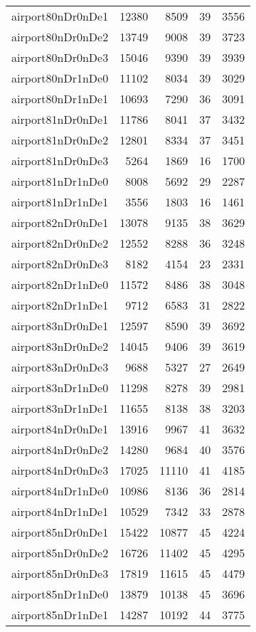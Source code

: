 \begin{longtable}{lrrrr}
airport80nDr0nDe1 & 12380 & 8509 & 39 & 3556 \\
airport80nDr0nDe2 & 13749 & 9008 & 39 & 3723 \\
airport80nDr0nDe3 & 15046 & 9390 & 39 & 3939 \\
airport80nDr1nDe0 & 11102 & 8034 & 39 & 3029 \\
airport80nDr1nDe1 & 10693 & 7290 & 36 & 3091 \\
airport81nDr0nDe1 & 11786 & 8041 & 37 & 3432 \\
airport81nDr0nDe2 & 12801 & 8334 & 37 & 3451 \\
airport81nDr0nDe3 & 5264 & 1869 & 16 & 1700 \\
airport81nDr1nDe0 & 8008 & 5692 & 29 & 2287 \\
airport81nDr1nDe1 & 3556 & 1803 & 16 & 1461 \\
airport82nDr0nDe1 & 13078 & 9135 & 38 & 3629 \\
airport82nDr0nDe2 & 12552 & 8288 & 36 & 3248 \\
airport82nDr0nDe3 & 8182 & 4154 & 23 & 2331 \\
airport82nDr1nDe0 & 11572 & 8486 & 38 & 3048 \\
airport82nDr1nDe1 & 9712 & 6583 & 31 & 2822 \\
airport83nDr0nDe1 & 12597 & 8590 & 39 & 3692 \\
airport83nDr0nDe2 & 14045 & 9406 & 39 & 3619 \\
airport83nDr0nDe3 & 9688 & 5327 & 27 & 2649 \\
airport83nDr1nDe0 & 11298 & 8278 & 39 & 2981 \\
airport83nDr1nDe1 & 11655 & 8138 & 38 & 3203 \\
airport84nDr0nDe1 & 13916 & 9967 & 41 & 3632 \\
airport84nDr0nDe2 & 14280 & 9684 & 40 & 3576 \\
airport84nDr0nDe3 & 17025 & 11110 & 41 & 4185 \\
airport84nDr1nDe0 & 10986 & 8136 & 36 & 2814 \\
airport84nDr1nDe1 & 10529 & 7342 & 33 & 2878 \\
airport85nDr0nDe1 & 15422 & 10877 & 45 & 4224 \\
airport85nDr0nDe2 & 16726 & 11402 & 45 & 4295 \\
airport85nDr0nDe3 & 17819 & 11615 & 45 & 4479 \\
airport85nDr1nDe0 & 13879 & 10138 & 45 & 3696 \\
airport85nDr1nDe1 & 14287 & 10192 & 44 & 3775 \\

\end{longtable}

